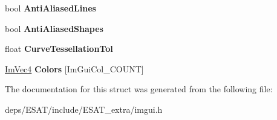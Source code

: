 \begin{DoxyCompactItemize}
bool {\bfseries Anti\+Aliased\+Lines}
\item 
\mbox{\label{struct_im_gui_style_ae3c6b2f226fe51631352a637f3defabb}} 
bool {\bfseries Anti\+Aliased\+Shapes}
\item 
\mbox{\label{struct_im_gui_style_a41eb9377b63b8b85ab807c28e00198e9}} 
float {\bfseries Curve\+Tessellation\+Tol}
\item 
\mbox{\label{struct_im_gui_style_a2b4941240a38d1300c39a7fa4f03d0a3}} 
\mbox{\hyperlink{struct_im_vec4}{Im\+Vec4}} {\bfseries Colors} \mbox{[}Im\+Gui\+Col\+\_\+\+C\+O\+U\+NT\mbox{]}
\end{DoxyCompactItemize}


The documentation for this struct was generated from the following file\+:\begin{DoxyCompactItemize}
\item 
deps/\+E\+S\+A\+T/include/\+E\+S\+A\+T\+\_\+extra/imgui.\+h\end{DoxyCompactItemize}
